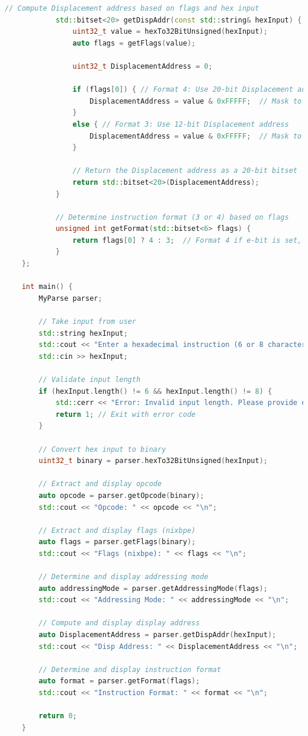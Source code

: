 \documentclass[12pt]{article}
\begin{document}
\begin{lstlisting}[language=C++,caption={SIC Instruction Parser in C++}]
            // Compute Displacement address based on flags and hex input
            std::bitset<20> getDispAddr(const std::string& hexInput) {
                uint32_t value = hexTo32BitUnsigned(hexInput);
                auto flags = getFlags(value);
    
                uint32_t DisplacementAddress = 0;
    
                if (flags[0]) { // Format 4: Use 20-bit Displacement address
                    DisplacementAddress = value & 0xFFFFF;  // Mask to get the lower 20 bits
                } 
                else { // Format 3: Use 12-bit Displacement address
                    DisplacementAddress = value & 0xFFFFF;  // Mask to get the lower 12 bits
                }
    
                // Return the Displacement address as a 20-bit bitset
                return std::bitset<20>(DisplacementAddress);
            }
    
            // Determine instruction format (3 or 4) based on flags
            unsigned int getFormat(std::bitset<6> flags) {
                return flags[0] ? 4 : 3;  // Format 4 if e-bit is set, else Format 3
            }
    };
    
    int main() {
        MyParse parser;
    
        // Take input from user
        std::string hexInput;
        std::cout << "Enter a hexadecimal instruction (6 or 8 characters): ";
        std::cin >> hexInput;
    
        // Validate input length
        if (hexInput.length() != 6 && hexInput.length() != 8) {
            std::cerr << "Error: Invalid input length. Please provide either 6 or 8 hexadecimal digits." << std::endl;
            return 1; // Exit with error code
        }
    
        // Convert hex input to binary
        uint32_t binary = parser.hexTo32BitUnsigned(hexInput);
    
        // Extract and display opcode
        auto opcode = parser.getOpcode(binary);
        std::cout << "Opcode: " << opcode << "\n";
    
        // Extract and display flags (nixbpe)
        auto flags = parser.getFlags(binary);
        std::cout << "Flags (nixbpe): " << flags << "\n";
    
        // Determine and display addressing mode
        auto addressingMode = parser.getAddressingMode(flags);
        std::cout << "Addressing Mode: " << addressingMode << "\n";
    
        // Compute and display display address
        auto DisplacementAddress = parser.getDispAddr(hexInput);
        std::cout << "Disp Address: " << DisplacementAddress << "\n";
    
        // Determine and display instruction format
        auto format = parser.getFormat(flags);
        std::cout << "Instruction Format: " << format << "\n";
    
        return 0;
    }
\end{lstlisting}
\end{document}
